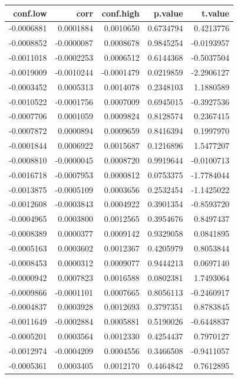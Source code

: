 \documentclass[]{tufte-handout}
\begin{document}
\begin{longtable}[]{@{}rrrrr@{}}
\toprule
conf.low & corr & conf.high & p.value & t.value \\
\midrule
\endhead
-0.0006881 & 0.0001884 & 0.0010650 & 0.6734794 & 0.4213776 \\
-0.0008852 & -0.0000087 & 0.0008678 & 0.9845254 & -0.0193957 \\
-0.0011018 & -0.0002253 & 0.0006512 & 0.6144368 & -0.5037504 \\
-0.0019009 & -0.0010244 & -0.0001479 & 0.0219859 & -2.2906127 \\
-0.0003452 & 0.0005313 & 0.0014078 & 0.2348103 & 1.1880589 \\
-0.0010522 & -0.0001756 & 0.0007009 & 0.6945015 & -0.3927536 \\
-0.0007706 & 0.0001059 & 0.0009824 & 0.8128574 & 0.2367415 \\
-0.0007872 & 0.0000894 & 0.0009659 & 0.8416394 & 0.1997970 \\
-0.0001844 & 0.0006922 & 0.0015687 & 0.1216896 & 1.5477207 \\
-0.0008810 & -0.0000045 & 0.0008720 & 0.9919644 & -0.0100713 \\
-0.0016718 & -0.0007953 & 0.0000812 & 0.0753375 & -1.7784044 \\
-0.0013875 & -0.0005109 & 0.0003656 & 0.2532454 & -1.1425022 \\
-0.0012608 & -0.0003843 & 0.0004922 & 0.3901354 & -0.8593720 \\
-0.0004965 & 0.0003800 & 0.0012565 & 0.3954676 & 0.8497437 \\
-0.0008389 & 0.0000377 & 0.0009142 & 0.9329058 & 0.0841895 \\
-0.0005163 & 0.0003602 & 0.0012367 & 0.4205979 & 0.8053844 \\
-0.0008453 & 0.0000312 & 0.0009077 & 0.9444213 & 0.0697140 \\
-0.0000942 & 0.0007823 & 0.0016588 & 0.0802381 & 1.7493064 \\
-0.0009866 & -0.0001101 & 0.0007665 & 0.8056113 & -0.2460917 \\
-0.0004837 & 0.0003928 & 0.0012693 & 0.3797351 & 0.8783845 \\
-0.0011649 & -0.0002884 & 0.0005881 & 0.5190026 & -0.6448837 \\
-0.0005201 & 0.0003564 & 0.0012330 & 0.4254437 & 0.7970127 \\
-0.0012974 & -0.0004209 & 0.0004556 & 0.3466508 & -0.9411057 \\
-0.0005361 & 0.0003405 & 0.0012170 & 0.4464842 & 0.7612895 \\

\end{longtable}
\end{document}
